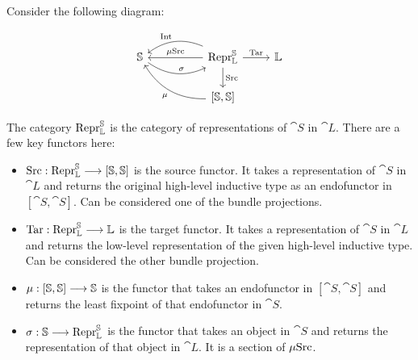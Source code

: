 Consider the following diagram:

\begin{equation}
  \begin{tikzcd}
    \cat S \arrow[r, bend right, "\sigma"]
    & [25pt] \Repr _{\cat L} ^{\cat S} \arrow[l, bend right, swap, "\fun {Int}"] \arrow[l, swap, "\mu \fun {Src}"] \arrow[r, "\fun {Tar}"] \arrow[d, "\fun {Src}"]
    & \cat L \\
    & {[\cat S, \cat S]} \arrow[ul, bend left, "\mu"] &
  \end{tikzcd}
\end{equation}

The category $\mathrm{Repr} _{\mathbb L} ^{\mathbb S}$ is the category of representations of
$\cat S$ in $\cat L$. There are a few key functors here:
\begin{itemize}
  \item $\mathrm {Src} : \mathrm{Repr} _{\mathbb L} ^{\mathbb S} \longrightarrow [\mathbb S, \mathbb S]$ is the source
        functor. It takes a representation of $\cat S$ in $\cat L$ and returns the
        original high-level inductive type as an endofunctor in $[\cat S, \cat S]$.
        Can be considered one of the bundle projections.
  \item $\mathrm {Tar} : \mathrm{Repr} _{\mathbb L} ^{\mathbb S} \longrightarrow \mathbb L$ is the target
        functor. It takes a representation of $\cat S$ in $\cat L$ and returns the
        low-level representation of the given high-level inductive type. Can be considered
        the other bundle projection.
  \item $\mu : [\mathbb S, \mathbb S] \longrightarrow \mathbb S$ is the
        functor that takes an endofunctor in $[\cat S, \cat S]$ and returns the
        least fixpoint of that endofunctor in $\cat S$.
  \item $\sigma : \mathbb S \longrightarrow \mathrm{Repr} _{\mathbb L} ^{\mathbb S}$ is the functor
        that takes an object in $\cat S$ and returns the representation of that
        object in $\cat L$. It is a section of $\mu \mathrm {Src}$.
\end{itemize}

